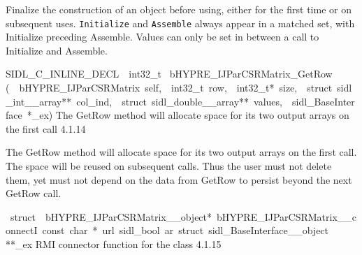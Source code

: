 \documentclass{article}
\begin{document}
\begin{cxxentry}
\begin{cxxentry}
\begin{cxxfunction}
\begin{cxxdoc}
Finalize the construction of an object before using, either
for the first time or on subsequent uses. {\tt Initialize}
and {\tt Assemble} always appear in a matched set, with
Initialize preceding Assemble. Values can only be set in
between a call to Initialize and Assemble.
\end{cxxdoc}
\end{cxxfunction}
\begin{cxxfunction}
{SIDL\_C\_INLINE\_DECL\ \ int32\_t\ }
        {bHYPRE\_IJParCSRMatrix\_GetRow}
        {(\ \ bHYPRE\_IJParCSRMatrix\ self,\ \ int32\_t\ row,\ \ int32\_t*\ size,\ \ struct\ sidl\_int\_\_array**\ col\_ind,\ \ struct\ sidl\_double\_\_array**\ values,\ \ sidl\_BaseInterface\ *\_ex)}
        {
The GetRow method will allocate space for its two output
arrays on the first call}
        {4.1.14}
\begin{cxxdoc}

The GetRow method will allocate space for its two output
arrays on the first call.  The space will be reused on
subsequent calls.  Thus the user must not delete them, yet
must not depend on the data from GetRow to persist beyond the
next GetRow call.
\end{cxxdoc}
\end{cxxfunction}
\begin{cxxvariable}
{\ struct\ \ bHYPRE\_IJParCSRMatrix\_\_object*\ bHYPRE\_IJParCSRMatrix\_\_connectI\ const\ char\ *\ url\ sidl\_bool\ ar\ struct\ sidl\_BaseInterface\_\_object}
        {**\_ex}
        {}
        {
RMI connector function for the class}
        {4.1.15}
\begin{cxxdoc}


\end{cxxdoc}
\end{cxxvariable}
\end{cxxentry}
\end{cxxentry}
\end{document}
